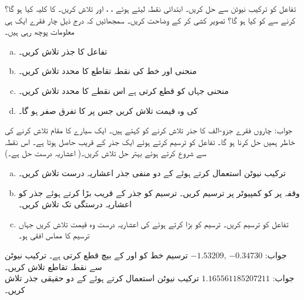 \quad
تفاعل  کو ترکیب نیوٹن سے حل کریں۔ ابتدائی نقطہ  لیتے ہوئے ، ،  اور  تلاش کریں۔  کا کلیہ کیا ہو گا؟   کرنے سے  کو کیا ہو گا؟ تصویر کشی کر کے وضاحت کریں۔
سمجھائیں کہ درج ذیل چار فقرے ایک ہی معلومات پوچھ رہی ہیں۔
\begin{enumerate}[a.]
\item
تفاعل  کا جذر تلاش کریں۔
\item
منحنی  اور خط  کی نقطہ تقاطع کا  محدد تلاش کریں۔ 
\item
منحنی  جہاں کو قطع کرتی ہے اس نقطے کا  محدد تلاش کریں۔
\item
{} کی وہ قیمت تلاش کریں جس پر  کا تفرق صفر ہو گا۔
\end{enumerate}
جواب:\quad
چاروں فقرے جزو-الف کا جذر تلاش کرنے کو کہتے ہیں۔
ایک سیارے کا مقام تلاش کرنے کی خاطر  ہمیں  حل کرنا ہو گا۔ تفاعل  کو ترسیم کرتے ہوئے ایک جذر  کے قریب حاصل ہوتا ہے۔ اس نقطہ سے شروع کرتے ہوئے بہتر حل  تلاش کریں۔(  اعشاریہ درست حل   ہے۔)
\begin{enumerate}[a.]
\item
ترکیب نیوٹن استعمال کرتے ہوئے  کے دو منفی جذر  اعشاریہ درست تلاش کریں۔
\item
وقفہ  پر  کو کمپیوٹر پر ترسیم  کریں۔ ترسیم کو جذر کے قریب بڑا کرتے ہوئے  جذر کو  اعشاریہ درستگی تک تلاش کریں۔
\item
تفاعل  کو ترسیم کریں۔ ترسیم کو بڑا کرتے ہوئے   کی  اعشاریہ درست وہ قیمت تلاش کریں جہاں ترسیم کا مماس افقی ہو۔
\end{enumerate}
جواب:\quad
$\num{-1.53209}, \, \num{-0.34730}$
ترسیم  خط  کو  اور  کے بیچ قطع کرتی ہے۔ ترکیب نیوٹن سے نقطہ تقاطع تلاش کریں۔\\
جواب:\quad
$\num{1.165561185207211}$
ترکیب نیوٹن استعمال کرتے ہوئے  کے دو حقیقی جذر تلاش کریں۔\\
